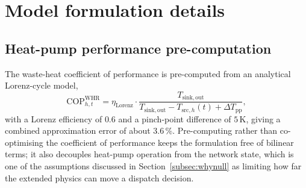 
\section{Model formulation details}
\label{app:model_details}

\subsection{Heat-pump performance pre-computation}
\label{app:cop}

The waste-heat coefficient of performance is pre-computed from an analytical Lorenz-cycle
model,
%
\begin{equation}
  \mathrm{COP}_{h,t}^{\mathrm{WHR}} = \eta_{\mathrm{Lorenz}}
  \cdot \frac{T_{\mathrm{sink,out}}}{T_{\mathrm{sink,out}} -
  T_{\mathrm{src},h}(t) + \Delta T_{\mathrm{pp}}},
\end{equation}
%
with a Lorenz efficiency of $0.6$ and a pinch-point difference of $5$\,K, giving a combined
approximation error of about $3.6$\,\%. Pre-computing rather than co-optimising the
coefficient of performance keeps the formulation free of bilinear terms; it also decouples
heat-pump operation from the network state, which is one of the assumptions discussed in
Section~\ref{subsec:whynull} as limiting how far the extended physics can move a dispatch
decision.

